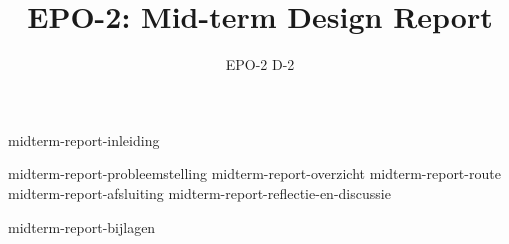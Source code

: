 \documentclass{report}
\title{EPO-2: Mid-term Design Report}
\author{EPO-2 D-2}
\begin{document}
\maketitle
\newpage
{}

{midterm-report-inleiding}
\tableofcontents

\newpage
{}

{midterm-report-probleemstelling}
{midterm-report-overzicht}
{midterm-report-route}
{midterm-report-afsluiting}
{midterm-report-reflectie-en-discussie}

\newpage
{}

\printbibliography
{midterm-report-bijlagen}
\end{document}
